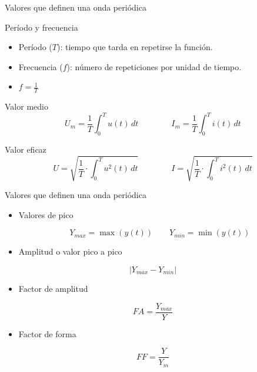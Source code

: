 \documentclass[aspectratio=169, usenames,svgnames,dvipsnames]{beamer}
\begin{document}
\begin{frame}[label={sec:orgb882861}]{Valores que definen una onda periódica}
\begin{block}{Período y frecuencia}
\begin{itemize}
\item Período (\(T\)): tiempo que tarda en repetirse la función.
\item Frecuencia (\(f\)): número de repeticiones por unidad de tiempo.
\item \(f = \frac{1}{T}\)
\end{itemize}
\end{block}
\begin{block}{Valor medio}
\[
U_m=\frac{1}{T}\int_{0}^{T}u(t)\, dt \qquad \qquad%
I_m=\frac{1}{T}\int_{0}^{T}i(t)\, dt
\]
\end{block}

\begin{block}{Valor eficaz}
\[
U = \sqrt{\frac{1}{T}\cdot\int_{0}^{T}u^{2}(t)\, dt} \qquad \qquad%
I = \sqrt{\frac{1}{T}\cdot\int_{0}^{T}i^{2}(t)\, dt}
\]
\end{block}
\end{frame}

\begin{frame}[label={sec:org8fbebab}]{Valores que definen una onda periódica}
\begin{itemize}
\item Valores de pico

\[
Y_{max} = \max(y(t)) \qquad Y_{min} = \min(y(t))
\]

\item Amplitud o valor pico a pico
\end{itemize}

\[
 |Y_{max} - Y_{min}|
\]

\begin{itemize}
\item Factor de amplitud
\end{itemize}

\[FA = \frac{Y_{max}}{Y}\]

\begin{itemize}
\item Factor de forma
\end{itemize}

\[FF = \frac{Y}{Y_{m}}\]
\end{frame}
\end{document}
